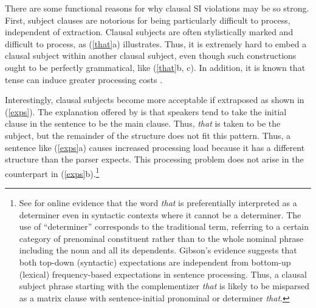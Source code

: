 \documentclass[output=paper
 	        ,biblatex
                ,babelshorthands
                ,newtxmath
                ,draftmode
                ,colorlinks, citecolor=brown
]{langscibook}
\begin{document}
\eal \label{ssc}

\zl

%



There are some functional reasons for why clausal SI violations may be so strong. First, subject
clauses are notorious for being particularly difficult to process, independent of
extraction. Clausal subjects are often stylistically marked and difficult to process, as
(\ref{that}a) illustrates. Thus, it is extremely hard to embed a clausal subject within another
clausal subject, even though such constructions ought to be perfectly grammatical, like
(\ref{that}b, c). In addition, it is known that tense can induce greater processing costs
\citep{kluender92,gibson0000}.

\eal  \label{that}

 
\zl


\noindent
Interestingly, clausal subjects become more acceptable if extraposed as shown in (\ref{exps}).  The
explanation offered by \citet[356--357]{fod74} is that speakers tend to take the initial clause in
the sentence to be the main clause. Thus, \emph{that} is taken to be the subject, but the remainder
of the structure does not fit this pattern. Thus, a sentence like (\ref{exps}a) causes increased
processing load because it has a different structure than the parser expects.  This processing
problem does not arise in the counterpart in (\ref{exps}b).\footnote{See \citet{gibson07} for online
  evidence that the word \emph{that} is preferentially interpreted as a determiner even in syntactic
  contexts where it cannot be a determiner. The use of ``determiner'' corresponds to the traditional
  term, referring to a certain category of prenominal constituent rather than to the whole nominal
  phrase including the noun and all its dependents.  Gibson's evidence suggests that both top-down
  (syntactic) expectations are independent from bottom-up (lexical) frequency-based expectations in
  sentence processing. Thus, a clausal subject phrase starting with the complementizer \emph{that}
  is likely to be misparsed as a matrix clause with sentence-initial pronominal or determiner
  \emph{that}.}
\end{document}
